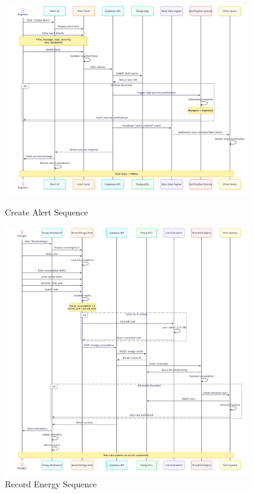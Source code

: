 \begin{figure}[H]
\centering
\begin{minipage}{0.48\textwidth}
\centering
\includegraphics[width=0.95\textwidth]{img/chap_06/sequence_create_alert.png}
\caption{Create Alert Sequence}
\end{minipage}
\hfill
\begin{minipage}{0.48\textwidth}
\centering
\includegraphics[width=0.95\textwidth]{img/chap_06/sequence_record_energy.png}
\caption{Record Energy Sequence}
\end{minipage}
\end{figure}

